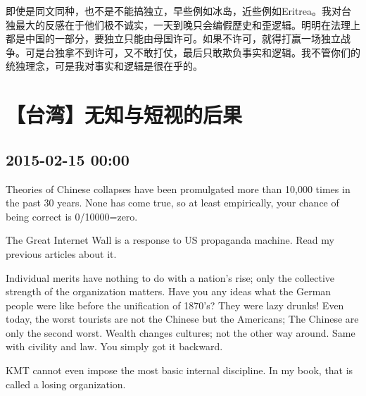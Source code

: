 \documentclass[twocolumn]{ctexart}
\begin{document}
即使是同文同种，也不是不能搞独立，早些例如冰岛，近些例如Eritrea。我对台独最大的反感在于他们极不诚实，一天到晚只会编假歷史和歪逻辑。明明在法理上都是中国的一部分，要独立只能由母国许可。如果不许可，就得打赢一场独立战争。可是台独拿不到许可，又不敢打仗，最后只敢欺负事实和逻辑。我不管你们的统独理念，可是我对事实和逻辑是很在乎的。\section*{【台湾】无知与短视的后果}
\subsection*{2015-02-15 00:00}
Theories of Chinese collapses have been promulgated more than 10,000 times in the past 30 years. None has come true, so at least empirically, your chance of being correct is 0/10000=zero.

The Great Internet Wall is a response to US propaganda machine. Read my previous articles about it.

Individual merits have nothing to do with a nation's rise; only the collective strength of the organization matters. Have you any ideas what the German people were like before the unification of 1870's? They were lazy drunks! Even today, the worst tourists are not the Chinese but the Americans; The Chinese are only the second worst. Wealth changes cultures; not the other way around. Same with civility and law. You simply got it backward.

KMT cannot even impose the most basic internal discipline. In my book, that is called a losing organization.
 
\end{document}
